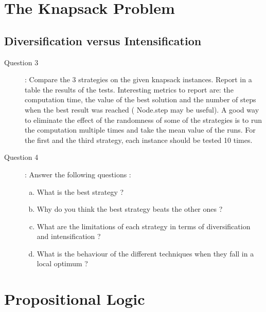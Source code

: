 

\usepackage{lipsum}




\tableofcontents
\thispagestyle{empty}	%
\newpage
{} %

\section{The Knapsack Problem}
\subsection{Diversification versus Intensification}
\begin{description}
\item[Question 3]: Compare the 3 strategies on the given knapsack instances. Report in a table the results of the tests. Interesting metrics to report are: the computation time, the value of the best solution and the number of steps when the best result was reached ( Node.step may be useful). A good way to eliminate the effect of the randomness of some of the strategies is to run the computation multiple times and take the mean value of the runs. For the first and the third strategy, each instance should be tested 10 times.\\

\item[Question 4]: Answer the following questions :
\begin{enumerate}[(a)]
\item What is the best strategy ?\\
\item Why do you think the best strategy beats the other ones ?\\
\item What are the limitations of each strategy in terms of diversification and intensification ?\\
\item What is the behaviour of the different techniques when they fall in a local optimum ?
\end{enumerate}
\end{description}

\section{Propositional Logic}
